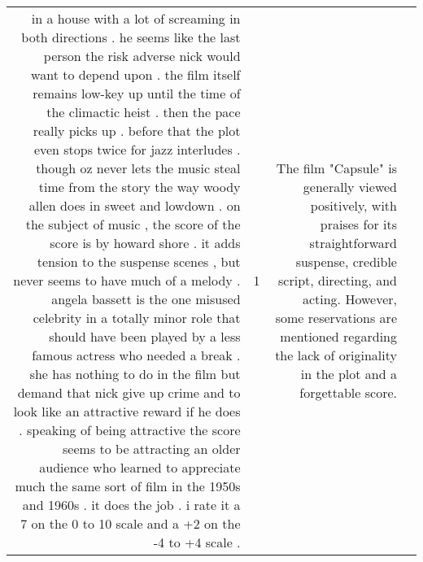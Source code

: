 \begin{tabular}{r{1cm} p{0.4in} r{1cm} p{0.4in}}
in a house with a lot of screaming in both directions .  he seems like the last person the risk adverse nick would want to depend upon .  the film itself remains low-key up until the time of the climactic heist .  then the pace really picks up .  before that the plot even stops twice for jazz interludes .  though oz never lets the music steal time from the story the way woody allen does in sweet and lowdown .  on the subject of music , the score of the score is by howard shore .  it adds tension to the suspense scenes , but never seems to have much of a melody .  angela bassett is the one misused celebrity in a totally minor role that should have been played by a less famous actress who needed a break .  she has nothing to do in the film but demand that nick give up crime and to look like an attractive reward if he does .  speaking of being attractive the score seems to be attracting an older audience who learned to appreciate much the same sort of film in the 1950s and 1960s .  it does the job .  i rate it a 7 on the 0 to 10 scale and a +2 on the -4 to +4 scale .   & 1 & The film "Capsule" is generally viewed positively, with praises for its straightforward suspense, credible script, directing, and acting. However, some reservations are mentioned regarding the lack of originality in the plot and a forgettable score. \\

\end{tabular}
